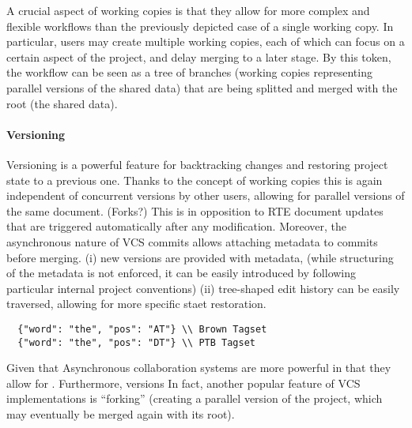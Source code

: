 \documentclass{sig-alternate}
\begin{document}
A crucial aspect of working copies is that they allow for more complex and flexible workflows
than the previously depicted case of a single working copy. In particular, users may create
multiple working copies, each of which can focus on a certain aspect of the project, and
delay merging to a later stage.
By this token, the workflow can be seen as a tree of branches (working copies
representing parallel versions of the shared data) that are being splitted and merged with
the root (the shared data).

\paragraph*{Versioning}
Versioning is a powerful feature for backtracking changes and restoring project state to a
previous one. Thanks to the concept of working copies this is again independent of concurrent
versions by other users, allowing for parallel versions of the same document. (Forks?)
This is in opposition to RTE document updates that are triggered automatically
after any modification. Moreover, the asynchronous nature of VCS commits allows attaching
metadata to commits before merging. 
(i) new versions are provided with metadata, (while structuring of the metadata is not enforced,
it can be easily introduced by following particular internal project conventions)
(ii) tree-shaped edit history can be easily traversed, allowing for more specific
staet restoration.

\begin{verbatim}
  {"word": "the", "pos": "AT"} \\ Brown Tagset
  {"word": "the", "pos": "DT"} \\ PTB Tagset
\end{verbatim}


Given that 
Asynchronous collaboration systems are more powerful in that they allow for .
Furthermore, versions
In fact, another popular feature of VCS implementations is ``forking'' (creating a parallel version
of the project, which may eventually be merged again with its root).
\end{document}
